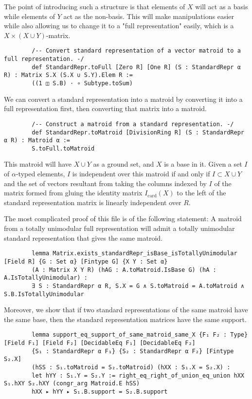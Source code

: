 \documentclass[sigplan,10pt,anonymous,review]{acmart}
\begin{document}
	The point of introducing such a structure is that elements of $X$ will act as a basis while elements of $Y$ act as the non-basis. This will make manipulations easier while also allowing us to change it to a "full representation" easily, which is a $X \times \left(X \cup Y\right)$-matrix.

	\begin{lstlisting}
		/-- Convert standard representation of a vector matroid to a full representation. -/
		def StandardRepr.toFull [Zero R] [One R] (S : StandardRepr α R) : Matrix S.X (S.X ∪ S.Y).Elem R :=
		((1 ◫ S.B) · ∘ Subtype.toSum)
	\end{lstlisting}

	We can convert a standard representation into a matroid by converting it into a full representation first, then converting that matrix into a matroid.

	\begin{lstlisting}
		/-- Construct a matroid from a standard representation. -/
		def StandardRepr.toMatroid [DivisionRing R] (S : StandardRepr α R) : Matroid α :=
		S.toFull.toMatroid
	\end{lstlisting}

	This matroid will have $X \cup Y$ as a ground set, and $X$ is a base in it. Given a set $I$ of $\alpha$-typed elements, $I$ is independent over this matroid if and only if $I \subset X \cup Y$ and the set of vectors resultant from taking the columns indexed by $I$ of the matrix formed from gluing the identity matrix $I_\text{card}\left(X\right)$ to the left of the standard representation matrix is linearly independent over $R$.

	The most complicated proof of this file is of the following statement:
	A matroid from a totally unimodular full representation will admit a totally unimodular standard representation that gives the same matroid.

	\begin{lstlisting}
		lemma Matrix.exists_standardRepr_isBase_isTotallyUnimodular [Field R] {G : Set α} [Fintype G] {X Y : Set α}
		(A : Matrix X Y R) (hAG : A.toMatroid.IsBase G) (hA : A.IsTotallyUnimodular) :
		∃ S : StandardRepr α R, S.X = G ∧ S.toMatroid = A.toMatroid ∧ S.B.IsTotallyUnimodular
	\end{lstlisting}

	Moreover, we show that if two standard representations of the same matroid have the same base, then the standard representation matrices have the same support.

	\begin{lstlisting}
		lemma support_eq_support_of_same_matroid_same_X {F₁ F₂ : Type} [Field F₁] [Field F₂] [DecidableEq F₁] [DecidableEq F₂]
		{S₁ : StandardRepr α F₁} {S₂ : StandardRepr α F₂} [Fintype S₂.X]
		(hSS : S₁.toMatroid = S₂.toMatroid) (hXX : S₁.X = S₂.X) :
		let hYY : S₁.Y = S₂.Y := right_eq_right_of_union_eq_union hXX S₁.hXY S₂.hXY (congr_arg Matroid.E hSS)
		hXX ▸ hYY ▸ S₁.B.support = S₂.B.support
	\end{lstlisting}
\end{document}
